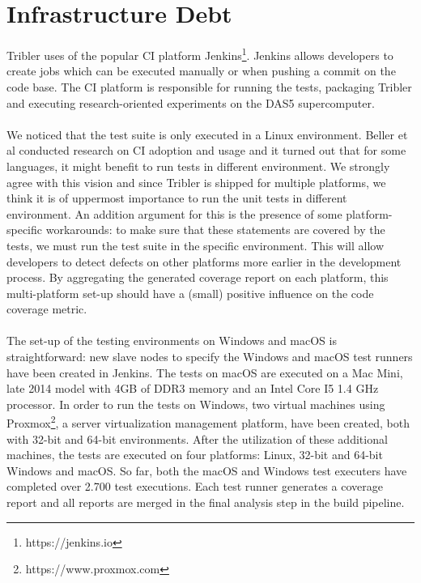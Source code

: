 \section{Infrastructure Debt}
Tribler uses of the popular CI platform Jenkins\footnote{https://jenkins.io}. Jenkins allows developers to create jobs which can be executed manually or when pushing a commit on the code base. The CI platform is responsible for running the tests, packaging Tribler and executing research-oriented experiments on the DAS5 supercomputer.\\\\
We noticed that the test suite is only executed in a Linux environment. Beller et al\cite{beller2016oops} conducted research on CI adoption and usage and it turned out that for some languages, it might benefit to run tests in different environment. We strongly agree with this vision and since Tribler is shipped for multiple platforms, we think it is of uppermost importance to run the unit tests in different environment. An addition argument for this is the presence of some platform-specific workarounds: to make sure that these statements are covered by the tests, we must run the test suite in the specific environment. This will allow developers to detect defects on other platforms more earlier in the development process. By aggregating the generated coverage report on each platform, this multi-platform set-up should have a (small) positive influence on the code coverage metric.\\\\
The set-up of the testing environments on Windows and macOS is straightforward: new slave nodes to specify the Windows and macOS test runners have been created in Jenkins. The tests on macOS are executed on a Mac Mini, late 2014 model with 4GB of DDR3 memory and an Intel Core I5 1.4 GHz processor. In order to run the tests on Windows, two virtual machines using Proxmox\footnote{https://www.proxmox.com}, a server virtualization management platform, have been created, both with 32-bit and 64-bit environments. After the utilization of these additional machines, the tests are executed on four platforms: Linux, 32-bit and 64-bit Windows and macOS. So far, both the macOS and Windows test executers have completed over 2.700 test executions. Each test runner generates a coverage report and all reports are merged in the final analysis step in the build pipeline.

